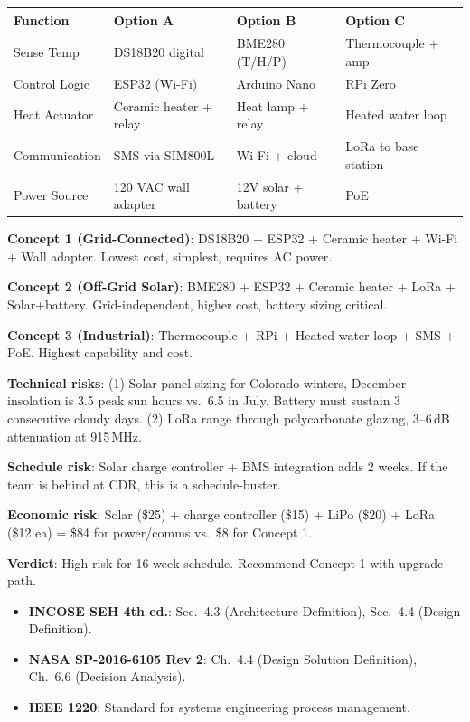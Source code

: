 \documentclass[11pt,letterpaper,twoside,openany]{book}
\begin{document}
\begin{greenshieldbox}
\small
\begin{tabularx}{\textwidth}{l X X X}
\toprule
\textbf{Function} & \textbf{Option A} & \textbf{Option B} & \textbf{Option C} \\
\midrule
Sense Temp & DS18B20 digital & BME280 (T/H/P) & Thermocouple + amp \\
Control Logic & ESP32 (Wi-Fi) & Arduino Nano & RPi Zero \\
Heat Actuator & Ceramic heater + relay & Heat lamp + relay & Heated water loop \\
Communication & SMS via SIM800L & Wi-Fi + cloud & LoRa to base station \\
Power Source & 120 VAC wall adapter & 12V solar + battery & PoE \\
\bottomrule
\end{tabularx}

\textbf{Concept 1 (Grid-Connected)}: DS18B20 + ESP32 + Ceramic heater + Wi-Fi + Wall adapter. Lowest cost, simplest, requires AC power.

\textbf{Concept 2 (Off-Grid Solar)}: BME280 + ESP32 + Ceramic heater + LoRa + Solar+battery. Grid-independent, higher cost, battery sizing critical.

\textbf{Concept 3 (Industrial)}: Thermocouple + RPi + Heated water loop + SMS + PoE. Highest capability and cost.
\end{greenshieldbox}

\begin{greenshieldbox}
\textbf{Technical risks}: (1) Solar panel sizing for Colorado winters, December insolation is 3.5 peak sun hours vs.\ 6.5 in July. Battery must sustain 3 consecutive cloudy days. (2) LoRa range through polycarbonate glazing, 3--6\,dB attenuation at 915\,MHz.

\textbf{Schedule risk}: Solar charge controller + BMS integration adds 2 weeks. If the team is behind at CDR, this is a schedule-buster.

\textbf{Economic risk}: Solar (\$25) + charge controller (\$15) + LiPo (\$20) + LoRa (\$12 ea) = \$84 for power/comms vs.\ \$8 for Concept 1.

\textbf{Verdict}: High-risk for 16-week schedule. Recommend Concept 1 with upgrade path.
\end{greenshieldbox}

\begin{keyconceptbox}
\begin{itemize}[nosep,leftmargin=1.5em]
\item \textbf{INCOSE SEH 4th ed.}: Sec.\ 4.3 (Architecture Definition), Sec.\ 4.4 (Design Definition).
\item \textbf{NASA SP-2016-6105 Rev 2}: Ch.\ 4.4 (Design Solution Definition), Ch.\ 6.6 (Decision Analysis).
\item \textbf{IEEE 1220}: Standard for systems engineering process management.
\end{itemize}
\end{keyconceptbox}
\end{document}
